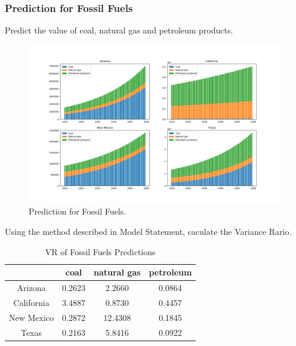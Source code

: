 \documentclass{mcmthesis}
\begin{document}
\subsubsection{Prediction for Fossil Fuels}
Predict the value of coal, natural gas and petroleum products.
\begin{figure}[htbp]
    \centering
    \includegraphics[width=\textwidth]{figures//figure5.png}
    \caption{Prediction for Fossil Fuels.}
  \end{figure}
  Using the method described in Model Statement, caculate the Variance Rario.
  \begin{table}[!h]
  			\centering
  			\begin{tabular}{cccc}
			\toprule  %
    		 &coal & natural gas & petroleum \\
			\midrule  %
			Arizona & 0.2623 & 2.2660 & 0.0864 \\
			\midrule
			California & 3.4887 & 0.8730 & 0.4457\\
			\midrule
			New Mexico & 0.2872 & 12.4308 & 0.1845 \\
			\midrule
			Texas & 0.2163 & 5.8416 & 0.0922 \\
			\bottomrule %
			\end{tabular}
			\caption{VR of Fossil Fuels Predictions}
			\end{table}\\
\end{document}

